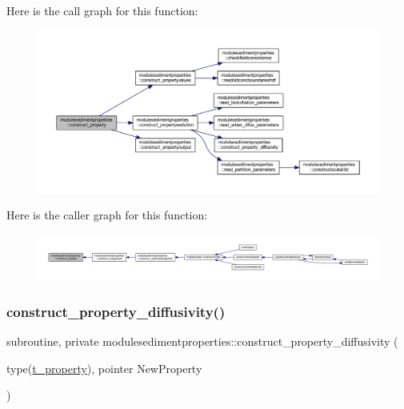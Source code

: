 Here is the call graph for this function\+:\nopagebreak
\begin{figure}[H]
\begin{center}
\leavevmode
\includegraphics[width=350pt]{namespacemodulesedimentproperties_ab01eb007762b8ce8366245977a153ea9_cgraph}
\end{center}
\end{figure}
Here is the caller graph for this function\+:\nopagebreak
\begin{figure}[H]
\begin{center}
\leavevmode
\includegraphics[width=350pt]{namespacemodulesedimentproperties_ab01eb007762b8ce8366245977a153ea9_icgraph}
\end{center}
\end{figure}
\mbox{\label{namespacemodulesedimentproperties_ad39d979b59e5b787373491b93c07fbf0}} 
\subsubsection{\texorpdfstring{construct\+\_\+property\+\_\+diffusivity()}{construct\_property\_diffusivity()}}
{\footnotesize\ttfamily subroutine, private modulesedimentproperties\+::construct\+\_\+property\+\_\+diffusivity (\begin{DoxyParamCaption}\item[{type(\mbox{\hyperlink{structmodulesedimentproperties_1_1t__property}{t\+\_\+property}}), pointer}]{New\+Property }\end{DoxyParamCaption})\hspace{0.3cm}{\ttfamily [private]}}

